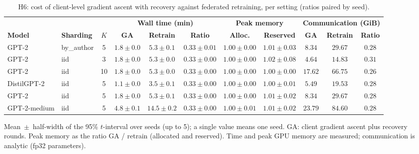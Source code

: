 \begin{table}[t]
\centering
\caption{H6: cost of client-level gradient ascent with recovery against federated retraining, per setting (ratios paired by seed).}
\label{tab:costs}
\footnotesize
\renewcommand{\arraystretch}{1.2}
\setlength{\tabcolsep}{2pt}
\begin{tabular*}{\textwidth}{@{\extracolsep{\fill}}llccccccccc@{}}
\toprule
 & & & \multicolumn{3}{c}{\textbf{Wall time (min)}} & \multicolumn{2}{c}{\textbf{Peak memory}} & \multicolumn{3}{c}{\textbf{Communication (GiB)}} \\
\cmidrule(lr){4-6}\cmidrule(lr){7-8}\cmidrule(lr){9-11}
\textbf{Model} & \textbf{Sharding} & \textbf{$K$} & \textbf{GA} & \textbf{Retrain} & \textbf{Ratio} & \textbf{Alloc.} & \textbf{Reserved} & \textbf{GA} & \textbf{Retrain} & \textbf{Ratio} \\
\midrule
GPT-2 & by\_author & 5 & $1.8 \pm 0.0$ & $5.3 \pm 0.1$ & $0.33 \pm 0.01$ & $1.00 \pm 0.00$ & $1.01 \pm 0.03$ & $8.34$ & $29.67$ & $0.28$ \\
GPT-2 & iid & 3 & $1.8 \pm 0.0$ & $5.3 \pm 0.0$ & $0.33 \pm 0.00$ & $1.00 \pm 0.00$ & $1.02 \pm 0.08$ & $4.64$ & $14.83$ & $0.31$ \\
GPT-2 & iid & 10 & $1.8 \pm 0.0$ & $5.3 \pm 0.0$ & $0.33 \pm 0.00$ & $1.00 \pm 0.00$ & $1.00 \pm 0.00$ & $17.62$ & $66.75$ & $0.26$ \\
DistilGPT-2 & iid & 5 & $1.1 \pm 0.0$ & $3.5 \pm 0.1$ & $0.33 \pm 0.00$ & $1.00 \pm 0.00$ & $1.00 \pm 0.01$ & $5.49$ & $19.53$ & $0.28$ \\
GPT-2 & iid & 5 & $1.8 \pm 0.0$ & $5.3 \pm 0.1$ & $0.33 \pm 0.00$ & $1.00 \pm 0.00$ & $1.01 \pm 0.02$ & $8.34$ & $29.67$ & $0.28$ \\
GPT-2-medium & iid & 5 & $4.8 \pm 0.1$ & $14.5 \pm 0.2$ & $0.33 \pm 0.00$ & $1.00 \pm 0.01$ & $1.01 \pm 0.02$ & $23.79$ & $84.60$ & $0.28$ \\
\bottomrule
\end{tabular*}

\smallskip
{\footnotesize Mean~$\pm$~half-width of the 95\% $t$-interval over seeds (up to 5); a single value means one seed. GA: client gradient ascent plus recovery rounds. Peak memory as the ratio GA / retrain (allocated and reserved). Time and peak GPU memory are measured; communication is analytic (fp32 parameters).\par}
\end{table}
